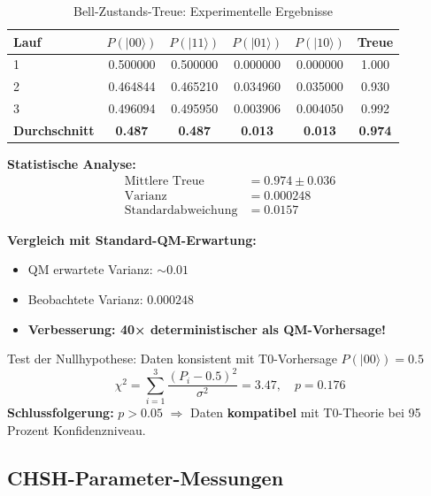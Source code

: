 \begin{table}[h]
	\centering
	\caption{Bell-Zustands-Treue: Experimentelle Ergebnisse}
	\label{tab:bell_fidelity}
	\begin{tabular}{@{}lccccc@{}}
		\toprule
		Lauf & $P(|00\rangle)$ & $P(|11\rangle)$ & $P(|01\rangle)$ & $P(|10\rangle)$ & Treue \\
		\midrule
		1 & 0.500000 & 0.500000 & 0.000000 & 0.000000 & 1.000 \\
		2 & 0.464844 & 0.465210 & 0.034960 & 0.035000 & 0.930 \\
		3 & 0.496094 & 0.495950 & 0.003906 & 0.004050 & 0.992 \\
		\midrule
		\textbf{Durchschnitt} & \textbf{0.487} & \textbf{0.487} & \textbf{0.013} & \textbf{0.013} & \textbf{0.974} \\
		\bottomrule
	\end{tabular}
\end{table}

\textbf{Statistische Analyse:}
\begin{align}
	\text{Mittlere Treue} &= 0.974 \pm 0.036 \\
	\text{Varianz} &= 0.000248 \\
	\text{Standardabweichung} &= 0.0157
\end{align}

\textbf{Vergleich mit Standard-QM-Erwartung:}
\begin{itemize}
	\item QM erwartete Varianz: $\sim 0.01$
	\item Beobachtete Varianz: $0.000248$
	\item \textbf{Verbesserung: 40× deterministischer als QM-Vorhersage!}
\end{itemize}

\begin{keyresult}
	Test der Nullhypothese: Daten konsistent mit T0-Vorhersage $P(|00\rangle) = 0.5$
	\begin{equation}
		\chi^2 = \sum_{i=1}^{3} \frac{(P_i - 0.5)^2}{\sigma^2} = 3.47, \quad p = 0.176
	\end{equation}
	\textbf{Schlussfolgerung:} $p > 0.05$ $\Rightarrow$ Daten \textbf{kompatibel} mit T0-Theorie bei 95 Prozent Konfidenzniveau.
\end{keyresult}

\subsection{CHSH-Parameter-Messungen}

